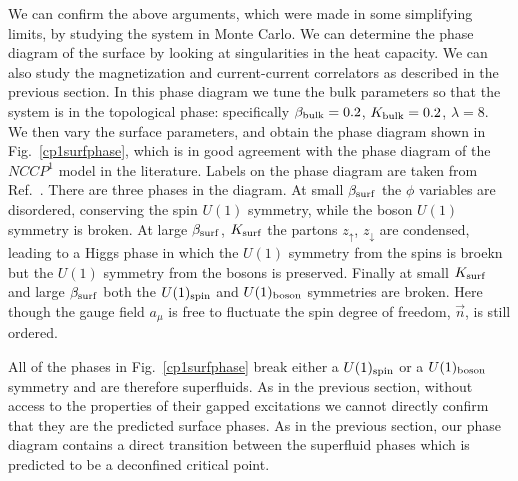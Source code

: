 \documentclass[prb,twocolumn]{revtex4-1}
\begin{document}
We can confirm the above arguments, which were made in some simplifying limits, by studying the system in Monte Carlo. We can determine the phase diagram of the surface by looking at singularities in the heat capacity. We can also study the magnetization and current-current correlators as described in the previous section. In this phase diagram we tune the bulk parameters so that the system is in the topological phase: specifically $\beta_{\rm bulk}=0.2$, $K_{\rm bulk}=0.2$, $\lambda=8$. We then vary the surface parameters, and obtain the phase diagram shown in Fig.~\ref{cp1surfphase}, which is in good agreement with the phase diagram of the $NCCP^1$ model in the literature. Labels on the phase diagram are taken from Ref.~.
There are three phases in the diagram. At small $\beta_{\rm surf}$ the $\phi$ variables are disordered, conserving the spin $U(1)$ symmetry, while the boson $U(1)$ symmetry is broken. At large $\beta_{\rm surf}$, $K_{\rm surf}$ the partons $z_\uparrow$, $z_\downarrow$ are condensed, leading to a Higgs phase in which the $U(1)$ symmetry from the spins is broekn but the $U(1)$ symmetry from the bosons is preserved. Finally at small $K_{\rm surf}$ and large $\beta_{\rm surf}$ both the $U(1)_{\rm spin}$ and $U(1)_{\rm boson}$ symmetries are broken. Here though the gauge field $a_\mu$ is free to fluctuate the spin degree of freedom, $\vec{n}$, is still ordered.

All of the phases in Fig.~\ref{cp1surfphase} break either a $U(1)_{\rm spin}$ or a $U(1)_{\rm boson}$ symmetry and are therefore superfluids. As in the previous section, without access to the properties of their gapped excitations we cannot directly confirm that they are the predicted surface phases. As in the previous section, our phase diagram contains a direct transition between the superfluid phases which is predicted to be a deconfined critical point.\cite{SenthilVishwanath}
\end{document}
